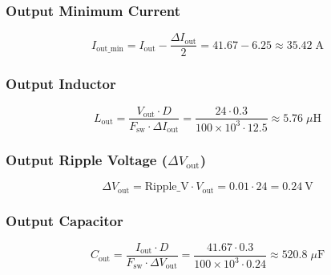 \subsubsection*{Output Minimum Current}
\begin{equation}
I_{\text{out\_min}} = I_{\text{out}} - \frac{\Delta I_{\text{out}}}{2} = 41.67 - 6.25 \approx \boxed{35.42\;\text{A}}
\end{equation}

\subsubsection*{Output Inductor}
\begin{equation}
L_{\text{out}} = \frac{V_{\text{out}} \cdot D}{F_{\text{sw}} \cdot \Delta I_{\text{out}}} = \frac{24 \cdot 0.3}{100 \times 10^3 \cdot 12.5} \approx \boxed{5.76\;\mu\text{H}}
\end{equation}

\subsubsection*{Output Ripple Voltage (\(\Delta V_{\text{out}}\))}
\begin{equation}
\Delta V_{\text{out}} = \text{Ripple\_V} \cdot V_{\text{out}} = 0.01 \cdot 24 = \boxed{\SI{0.24}{\volt}}
\end{equation}

\subsubsection*{Output Capacitor}
\begin{equation}
C_{\text{out}} = \frac{I_{\text{out}} \cdot D}{F_{\text{sw}} \cdot \Delta V_{\text{out}}} = \frac{41.67 \cdot 0.3}{100 \times 10^3 \cdot 0.24} \approx \boxed{520.8\;\mu\text{F}}
\end{equation}

